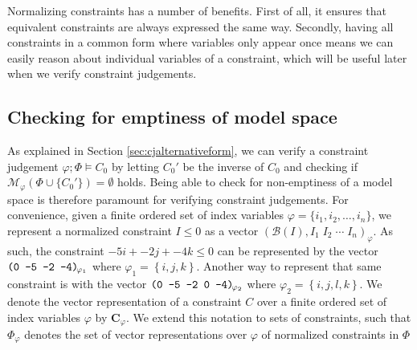 %
Normalizing constraints has a number of benefits. First of all, it ensures that equivalent constraints are always expressed the same way. Secondly, having all constraints in a common form where variables only appear once means we can easily reason about individual variables of a constraint, which will be useful later when we verify constraint judgements.
%
\subsection{Checking for emptiness of model space}
As explained in Section \ref{sec:cjalternativeform}, we can verify a constraint judgement $\varphi;\Phi \vDash C_0$ by letting $C_0'$ be the inverse of $C_0$ and checking if $\mathcal{M}_\varphi(\Phi \cup \{C_0'\}) = \emptyset$ holds. Being able to check for non-emptiness of a model space is therefore paramount for verifying constraint judgements. For convenience, given a finite ordered set of index variables $\varphi = \{i_1, i_2, \dots, i_n\}$, we represent a normalized constraint $I \leq 0$ as a vector $\left( \mathcal{B}(I), I_1\; I_2\; \cdots\; I_n \right)_{\varphi}$. As such, the constraint $-5i + -2j + -4k \leq 0$ can be represented by the vector $\cvect[\varphi_1]{0 {-5} {-2} {-4}}$ where $\varphi_1=\left\{i, j, k\right\}$. Another way to represent that same constraint is with the vector $\cvect[\varphi_2]{0 {-5} {-2} 0 {-4}}$ where $\varphi_2 = \left\{i,j,l,k\right\}$. We denote the vector representation of a constraint $C$ over a finite ordered set of index variables $\varphi$ by $\mathbf{C}_{\varphi}$. We extend this notation to sets of constraints, such that $\Phi_{\varphi}$ denotes the set of vector representations over $\varphi$ of normalized constraints in $\Phi$\\

